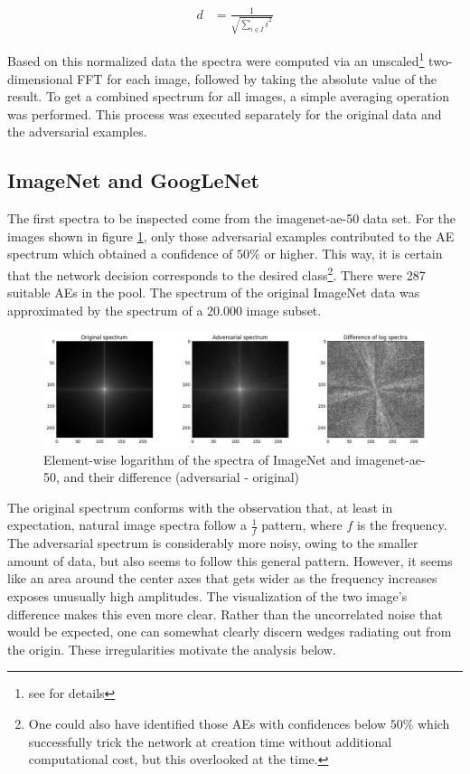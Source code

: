 \documentclass[11pt, a4paper]{article}
\begin{document}
\begin{align}
	d &= \frac{1}{\displaystyle \sqrt{\sum_{i \in I}{i^2}}} \label{eq:image-normalization}
\end{align}

Based on this normalized data the spectra were computed via an unscaled\footnote{see \cite{numpy-fft} for details} two-dimensional FFT for each image, followed by taking the absolute value of the result. To get a combined spectrum for all images, a simple averaging operation was performed. This process was executed separately for the original data and the adversarial examples.

\subsection{ImageNet and GoogLeNet}
The first spectra to be inspected come from the imagenet-ae-50 data set. For the images shown in figure \ref{fig:imagenet-ae-50-spectra}, only those adversarial examples contributed to the AE spectrum which obtained a confidence of $50\%$ or higher. This way, it is certain that the network decision corresponds to the desired class\footnote{One could also have identified those AEs with confidences below $50\%$ which successfully trick the network at creation time without additional computational cost, but this overlooked at the time.}. There were 287 suitable AEs in the pool. The spectrum of the original ImageNet data was approximated by the spectrum of a 20.000 image subset.

\begin{figure}[h!tb]
	\centering
	\includegraphics[width=\textwidth]{images/spectra/imagenet-ae-50-minconfidence-0dot5-maxorig-20000-spectra.png}
	\caption{Element-wise logarithm of the spectra of ImageNet and imagenet-ae-50, and their difference (adversarial - original)}
	\label{fig:imagenet-ae-50-spectra}
\end{figure}

The original spectrum conforms with the observation that, at least in expectation, natural image spectra follow a $\frac{1}{f}$ pattern, where $f$ is the frequency\cite{relations-between-natural-image-statistics-and-cortical-cells}. The adversarial spectrum is considerably more noisy, owing to the smaller amount of data, but also seems to follow this general pattern. However, it seems like an area around the center axes that gets wider as the frequency increases exposes unusually high amplitudes. The visualization of the two image's difference makes this even more clear. Rather than the uncorrelated noise that would be expected, one can somewhat clearly discern wedges radiating out from the origin. These irregularities motivate the analysis below.
\end{document}
